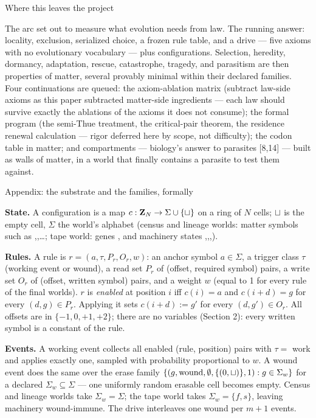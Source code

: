 \sec Where this leaves the project

The arc set out to measure what evolution needs from law. The
running answer: locality, exclusion, serialized choice, a frozen
rule table, and a drive --- five axioms with no evolutionary
vocabulary --- plus configurations. Selection, heredity, dormancy,
adaptation, rescue, catastrophe, tragedy, and parasitism are then
properties of matter, several provably minimal within their
declared families. Four continuations are queued: the axiom-ablation matrix
(subtract law-side axioms as this paper subtracted matter-side
ingredients --- each law should survive exactly the ablations of
the axioms it does not consume); the formal program (the
semi-Thue treatment, the critical-pair theorem, the residence
renewal calculation --- rigor deferred here by scope, not
difficulty); the codon table in matter; and compartments ---
biology's answer to parasites [8,14] --- built as walls of
matter, in a world that finally contains a parasite to test them
against.

\sec Appendix: the substrate and the families, formally

{\bf State.} A configuration is a map $c:{\bf Z}_N\to\Sigma\cup\{\sqcup\}$
on a ring of $N$ cells; $\sqcup$ is the empty cell, $\Sigma$ the
world's alphabet (census and lineage worlds: matter symbols such as
,,\dots; tape world: genes , and machinery
states ,,,).

{\bf Rules.} A rule is $r=(a,\tau,P_r,O_r,w)$: an anchor symbol
$a\in\Sigma$, a trigger class $\tau$ (working event or wound), a
read set $P_r$ of (offset, required symbol) pairs, a write set
$O_r$ of (offset, written symbol) pairs, and a weight $w$ (equal to
1 for every rule of the final worlds). $r$ is {\it enabled} at
position $i$ iff $c(i)=a$ and $c(i{+}d)=g$ for every $(d,g)\in P_r$.
Applying it sets $c(i{+}d):=g'$ for every $(d,g')\in O_r$. All
offsets are in $\{-1,0,+1,+2\}$; there are no variables (Section 2):
every written symbol is a constant of the rule.

{\bf Events.} A working event collects all enabled
(rule, position) pairs with $\tau=$ work and applies exactly one,
sampled with probability proportional to $w$. A wound event does the same over the
erase family $\{(g,\hbox{wound},\emptyset,\{(0,\sqcup)\},1):
g\in\Sigma_w\}$ for a declared $\Sigma_w\subseteq\Sigma$ ---
one uniformly random erasable cell becomes empty. Census and
lineage worlds take $\Sigma_w=\Sigma$; the tape world takes
$\Sigma_w=\{f,s\}$, leaving machinery wound-immune. The drive interleaves one wound per $m{+}1$
events.

